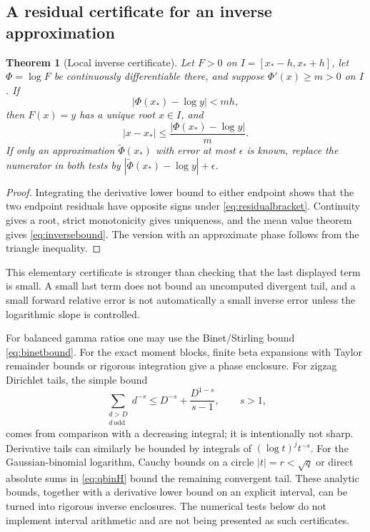 \documentclass[11pt,a4paper]{article}
\newtheorem{theorem}{Theorem}[section]
\theoremstyle{definition}
\theoremstyle{remark}
\numberwithin{equation}{section}
\begin{document}
\subsection{A residual certificate for an inverse approximation}
\begin{theorem}[Local inverse certificate]
\label{thm:certificate}
Let $F>0$ on $I=[x_*-h,x_*+h]$, let $\Phi=\log F$ be continuously differentiable there, and suppose $\Phi'(x)\ge m>0$ on $I$. If
\begin{equation}
 |\Phi(x_*)-\log y|<mh,
 \label{eq:residualbracket}
\end{equation}
then $F(x)=y$ has a unique root $x\in I$, and
\begin{equation}
 |x-x_*|\le\frac{|\Phi(x_*)-\log y|}{m}.
 \label{eq:inversebound}
\end{equation}
If only an approximation $\widetilde\Phi(x_*)$ with error at most $\epsilon$ is known, replace the numerator in both tests by
$|\widetilde\Phi(x_*)-\log y|+\epsilon$.
\end{theorem}
\begin{proof}
Integrating the derivative lower bound to either endpoint shows that the two endpoint residuals have opposite signs under \eqref{eq:residualbracket}. Continuity gives a root, strict monotonicity gives uniqueness, and the mean value theorem gives \eqref{eq:inversebound}. The version with an approximate phase follows from the triangle inequality.
\end{proof}

This elementary certificate is stronger than checking that the last displayed term is small. A small last term does not bound an uncomputed divergent tail, and a small forward relative error is not automatically a small inverse error unless the logarithmic slope is controlled.

For balanced gamma ratios one may use the Binet/Stirling bound \eqref{eq:binetbound}. For the exact moment blocks, finite beta expansions with Taylor remainder bounds or rigorous integration give a phase enclosure. For zigzag Dirichlet tails, the simple bound
\begin{equation}
 \sum_{\substack{d>D\\d\ \mathrm{odd}}}d^{-s}
 \le D^{-s}+\frac{D^{1-s}}{s-1},\qquad s>1,
 \label{eq:dirichlettail}
\end{equation}
comes from comparison with a decreasing integral; it is intentionally not sharp. Derivative tails can similarly be bounded by integrals of $(\log t)^j t^{-s}$. For the Gaussian-binomial logarithm, Cauchy bounds on a circle $|t|=r<\sqrt q$ or direct absolute sums in \eqref{eq:qbinH} bound the remaining convergent tail. These analytic bounds, together with a derivative lower bound on an explicit interval, can be turned into rigorous inverse enclosures. The numerical tests below do not implement interval arithmetic and are not being presented as such certificates.
\end{document}
